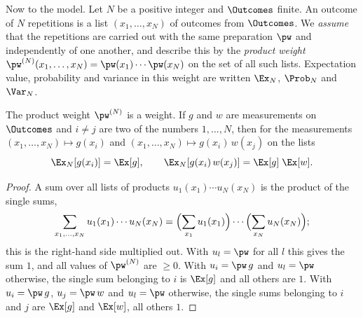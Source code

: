 \begin{vertiefung}
  Now to the model. Let $N$ be a positive integer and $\Outcomes$ finite. An outcome
  of $N$ repetitions is a list $(x_1, \dots, x_N)$
  of outcomes from $\Outcomes$. We \emph{assume} that the repetitions are carried out with
  the same preparation $\pw$ and independently of one another, and describe this by the
  \emph{product weight}
  $\pw^{(N)}(x_1, \dots, x_N) = \pw(x_1)\cdots\pw(x_N)$ on the set of all such lists.
  Expectation value, probability and variance in this weight are written $\Ex_N$,
  $\Prob_N$ and $\Var_N$.

  \begin{lemma}\label{c01.lem.produkt}
    The product weight $\pw^{(N)}$ is a weight. If $g$ and $w$ are measurements on
    $\Outcomes$ and $i \neq j$ are two of the numbers $1, \dots, N$, then for the
    measurements $(x_1, \dots, x_N) \mapsto g(x_i)$ and
    $(x_1, \dots, x_N) \mapsto g(x_i)\,w(x_j)$ on the lists
    \begin{equation}\label{c01.eq.produkt}
      \Ex_N[g(x_i)] = \Ex[g],
      \qquad
      \Ex_N[g(x_i)\,w(x_j)] = \Ex[g]\;\Ex[w] .
    \end{equation}
  \end{lemma}
  \begin{proof}
    A sum over all lists of products $u_1(x_1)\cdots u_N(x_N)$ is the product of the
    single sums,
    \begin{equation*}
      \sum_{x_1, \dots, x_N} u_1(x_1)\cdots u_N(x_N)
      = \Bigl(\sum_{x_1} u_1(x_1)\Bigr)\cdots\Bigl(\sum_{x_N} u_N(x_N)\Bigr) ;
    \end{equation*}
    this is the right-hand side multiplied out. With $u_l = \pw$ for all $l$ this gives the sum
    $1$, and all values of $\pw^{(N)}$ are $\geq 0$. With $u_i = \pw\, g$ and $u_l = \pw$
    otherwise, the single sum belonging to $i$ is $\Ex[g]$ and all others are $1$. With
    $u_i = \pw\, g$, $u_j = \pw\, w$ and $u_l = \pw$ otherwise, the single sums belonging
    to $i$ and $j$ are $\Ex[g]$ and $\Ex[w]$, all others $1$.
  \end{proof}


\end{vertiefung}
